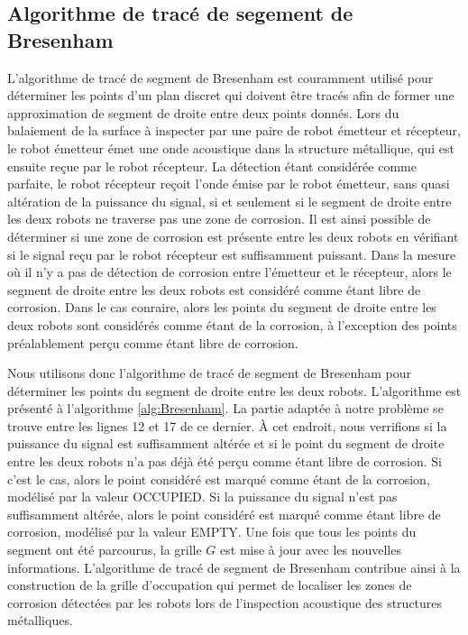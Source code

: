 \documentclass[francais,RandD]{rapportPFE}
\begin{document}
		\subsection*{Algorithme de tracé de segement de Bresenham}
			L'algorithme de tracé de segment de Bresenham est couramment utilisé pour déterminer les points d'un plan discret qui doivent être tracés afin de former une approximation de segment de droite entre deux points donnés.
			Lors du balaiement de la surface à inspecter par une paire de robot émetteur et récepteur, le robot émetteur émet une onde acoustique dans la structure métallique, qui est ensuite reçue par le robot récepteur.
			La détection étant considérée comme parfaite, le robot récepteur reçoit l'onde émise par le robot émetteur, sans quasi altération de la puissance du signal, si et seulement si le segment de droite entre les deux robots ne traverse pas une zone de corrosion.
			Il est ainsi possible de déterminer si une zone de corrosion est présente entre les deux robots en vérifiant si le signal reçu par le robot récepteur est suffisamment puissant.
			Dans la mesure où il n'y a pas de détection de corrosion entre l'émetteur et le récepteur, alors le segment de droite entre les deux robots est considéré comme étant libre de corrosion.
			Dans le cas conraire, alors les points du segment de droite entre les deux robots sont considérés comme étant de la corrosion, à l'exception des points préalablement perçu comme étant libre de corrosion.

			Nous utilisons donc l'algorithme de tracé de segment de Bresenham pour déterminer les points du segment de droite entre les deux robots.
			L'algorithme est présenté à l'algorithme \ref{alg:Bresenham}. La partie adaptée à notre problème se trouve entre les lignes 12 et 17 de ce dernier.
			À cet endroit, nous verrifions si la puissance du signal est suffisamment altérée et si le point du segment de droite entre les deux robots n'a pas déjà été perçu comme étant libre de corrosion.
			Si c'est le cas, alors le point considéré est marqué comme étant de la corrosion, modélisé par la valeur OCCUPIED. Si la puissance du signal n'est pas suffisamment altérée, alors le point considéré est marqué comme étant libre de corrosion, modélisé par la valeur EMPTY.
			Une fois que tous les points du segment ont été parcourus, la grille $G$ est mise à jour avec les nouvelles informations.
			L'algorithme de tracé de segment de Bresenham contribue ainsi à la construction de la grille d'occupation qui permet de localiser les zones de corrosion détectées par les robots lors de l'inspection acoustique des structures métalliques.
\end{document}
